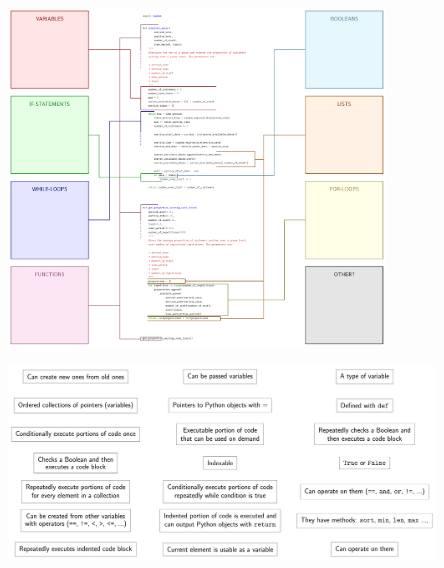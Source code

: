 \documentclass[a3paper, landscape]{article}
\begin{document}
\begin{center}

\vspace*{\fill}

\includegraphics[width=0.75\textwidth]{../assets/concepts1-diagram-blank}

\vspace*{\fill}

\end{center}

\newpage

\begin{center}

\vspace*{\fill}

\includegraphics[width=0.85\textwidth]{../assets/concepts1-diagram-sentences}

\vspace*{\fill}

\end{center}
\end{document}
